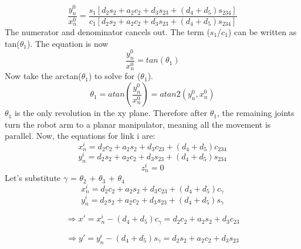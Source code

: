 \begin{equation}
	\frac{y^{0}_{n}}{x^{0}_{n}} = 
		\frac{s_{1}[d_{2}s_{2}+a_{2}c_{2}+d_{3}s_{23}+(d_{4}+d_{5})s_{234}]}
	{c_{1}[d_{2}s_{2}+a_{2}c_{2}+d_{3}s_{23}+(d_{4}+d_{5})s_{234}]}
	\label{sample_return_rover:inv_kinematics:th1}
\end{equation}
The numerator and denominator cancels out. The term ($s_{1}$/$c_{1}$) can be written as tan($\theta_{1}$). The equation is now 
\begin{equation}
	\frac{y^{0}_{n}}{x^{0}_{n}} = tan(\theta_{1})
\end{equation}
Now take the arctan($\theta_{1}$) to solve for ($\theta_{1}$).
\begin{equation}
	\theta_{1} = atan(\frac{y^{0}_{n}}{x^{0}_{n}}) =  atan2(y^{0}_{n}, x^{0}_{n})
\end{equation}
 $\theta_{1}$ is the only revolution in the xy plane. Therefore after $\theta_{1}$, the remaining joints turn the robot arm to a planar manipulator, meaning all the movement is parallel. Now, the equations for link i are:
 \begin{equation} \nonumber
 	x^{i}_{n} = d_{2}c_{2}+a_{2}s_{2}+d_{3}c_{23}+(d_{4}+d_{5})c_{234}
 \end{equation}
\begin{equation}
		y^{i}_{n}= d_{2}s_{2}+a_{2}c_{2}+d_{3}s_{23}+(d_{4}+d_{5})s_{234}
\end{equation}
\begin{equation} \nonumber
	z^{i}_{n} = 0
\end{equation}
Let's substitute $\gamma$ = $\theta_{2}$ + $\theta_{3}$ + $\theta_{4}$
 \begin{equation} \nonumber
	x^{i}_{n} = d_{2}c_{2}+a_{2}s_{2}+d_{3}c_{23}+(d_{4}+d_{5})c_{\gamma}
\end{equation}
\begin{equation}\nonumber
	y^{i}_{n} = d_{2}s_{2}+a_{2}c_{2}+d_{3}s_{23}+(d_{4}+d_{5})s_{\gamma}
\end{equation}

\begin{equation}
	\Rightarrow x' = x^{i}_{n} -(d_{4}+d_{5})c_{\gamma} = d_{2}c_{2}+a_{2}s_{2}+d_{3}c_{23}
	\label{sample_return_rover:inv_kinematics:c23}
\end{equation}

\begin{equation}
	\Rightarrow y' = y^{i}_{n} -(d_{4}+d_{5})s_{\gamma} = d_{2}s_{2}+a_{2}c_{2}+d_{3}s_{23}
	\label{sample_return_rover:inv_kinematics:s23}
\end{equation}

